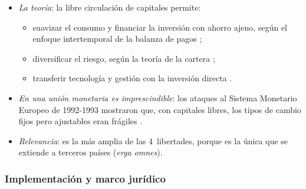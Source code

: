 \documentclass[11pt]{article}
\begin{document}
\begin{itemize}
\item \emph{La teoría}: la libre circulación de capitales permite:
  \begin{itemize}
  \item suavizar el consumo y financiar la inversión con ahorro ajeno, según el enfoque intertemporal de la balanza de pagos ;
  \item diversificar el riesgo, según la teoría de la cartera ;
  \item transferir tecnología y gestión con la inversión directa .
  \end{itemize}
\item \emph{En una unión monetaria es imprescindible}: los ataques al Sistema Monetario Europeo de 1992-1993 mostraron que, con capitales libres, los tipos de cambio fijos pero ajustables eran frágiles .
\item \emph{Relevancia}: es la más amplia de las 4~libertades, porque es la única que se extiende a terceros países (\emph{erga omnes}).
\end{itemize}

\subsubsection{Implementación y marco jurídico}\label{sec:capitales-marco}
\end{document}
